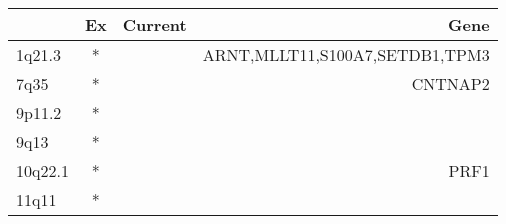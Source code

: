 \begin{tabular}{lccr}
\toprule
{} & Ex & Current &                            Gene \\
\midrule
1q21.3  &  * &         &  ARNT,MLLT11,S100A7,SETDB1,TPM3 \\
7q35    &  * &         &                         CNTNAP2 \\
9p11.2  &  * &         &                                 \\
9q13    &  * &         &                                 \\
10q22.1 &  * &         &                            PRF1 \\
11q11   &  * &         &                                 \\
\bottomrule
\end{tabular}
